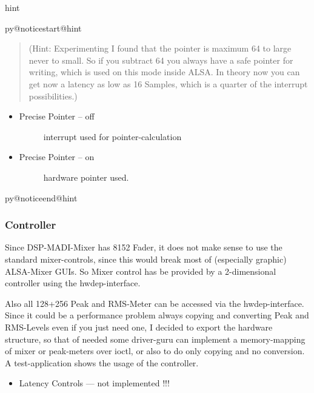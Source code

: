 \documentclass[a4paper,8pt,english]{sphinxmanual}
\makeatletter
\renewenvironment{notice}[2]{%
          \def\py@noticetype{#1}
          \begin{coloredbox}{#1}
          \bf\it
          \par\strong{#2}
          \csname py@noticestart@#1\endcsname
        }
	{
          \csname py@noticeend@\py@noticetype\endcsname
          \end{coloredbox}
        }
\makeatother
\begin{document}
\begin{notice}{hint}{Hint:}\begin{quote}

(Hint: Experimenting I found that the pointer is maximum 64 to
large never to small. So if you subtract 64 you always have a
safe pointer for writing, which is used on this mode inside
ALSA. In theory now you can get now a latency as low as 16
Samples, which is a quarter of the interrupt possibilities.)
\end{quote}
\begin{itemize}
\item {} \begin{description}
\item[{Precise Pointer -- off}] \leavevmode
interrupt used for pointer-calculation

\end{description}

\item {} \begin{description}
\item[{Precise Pointer -- on}] \leavevmode
hardware pointer used.

\end{description}

\end{itemize}
\end{notice}


\subsubsection{Controller}
\label{sound/cards/hdspm:controller}
Since DSP-MADI-Mixer has 8152 Fader, it does not make sense to
use the standard mixer-controls, since this would break most of
(especially graphic) ALSA-Mixer GUIs. So Mixer control has be
provided by a 2-dimensional controller using the
hwdep-interface.

Also all 128+256 Peak and RMS-Meter can be accessed via the
hwdep-interface. Since it could be a performance problem always
copying and converting Peak and RMS-Levels even if you just need
one, I decided to export the hardware structure, so that of
needed some driver-guru can implement a memory-mapping of mixer
or peak-meters over ioctl, or also to do only copying and no
conversion. A test-application shows the usage of the controller.
\begin{itemize}
\item {} 
Latency Controls --- not implemented !!!

\end{itemize}
\end{document}
